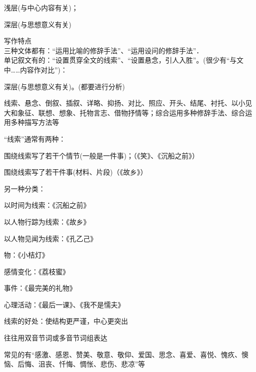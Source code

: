 \begin{asparaenum}[(1)]
\item 浅层(与中心内容有关)；
\item 深层(与思想意义有关)
\end{asparaenum}

\begin{asparaenum}[(1)]
\item 写作特点\\
三种文体都有：``运用比喻的修辞手法''、``运用设问的修辞手法''．\\
单记叙文有的：``设置贯穿全文的线索''、``设置悬念，引人入胜''。(很少有``与文中\ldots{}\ldots{}内容作对比'')：\\
\item 深层(与思想意义有关)。(都要进行分析)
\end{asparaenum}

线索、悬念、倒叙、插叙、详略、抑扬、对比、照应、开头、结尾、衬托、以小见大和象征、联想、想象、托物言志、借物抒情等；综合运用多种修辞手法、综合运用多种描写方法等\par
``线索''通常有两种：\begin{asparaenum}[(1)]\item 围绕线索写了若干个情节(一般是一件事)；（《笑》、《沉船之前》）
                      \item 围绕线索写了若干件事(材料、片段)（《故乡》）\end{asparaenum}

另一种分类：\begin{asparaenum}[(1)]\item 以时间为线索：《沉船之前》
              \item 以人物行踪为线索：《故乡》
              \item 以人物见闻为线索：《孔乙己》
              \item 物：《小桔灯》
              \item 感情变化：《荔枝蜜》
              \item 事件：《最完美的礼物》
              \item 心理活动：《最后一课》、《我不是懦夫》\end{asparaenum}

线索的好处：使结构更严谨，中心更突出

  往往用双音节词或多音节词组表达

  常见的有``感激、感恩、赞美、敬意、敬仰、爱国、思念、喜爱、喜悦、愧疚、懊恼、后悔、沮丧、忏悔、惆怅、悲伤、悲凉''等

